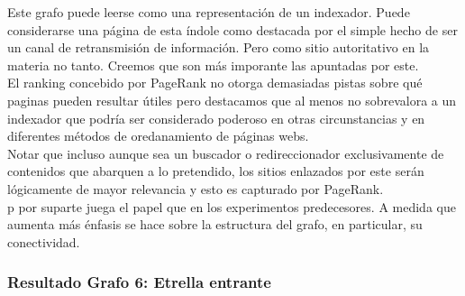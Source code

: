 Este grafo puede leerse como una representación de un indexador. Puede considerarse una página de esta índole como destacada por el simple hecho de ser un canal de retransmisión de información. Pero como sitio autoritativo en la materia no tanto. Creemos que son más imporante las apuntadas por este. \\

El ranking concebido por PageRank no otorga demasiadas pistas sobre qué paginas pueden resultar útiles pero destacamos que al menos no sobrevalora a un indexador que podría ser considerado poderoso en otras circunstancias y en diferentes métodos de oredanamiento de páginas webs. \\
Notar que incluso aunque sea un buscador o redireccionador exclusivamente de contenidos que abarquen a lo pretendido, los sitios enlazados por este serán lógicamente de mayor relevancia y esto es capturado por PageRank.\\

p por suparte juega el papel que en los experimentos predecesores. A medida que aumenta más énfasis se hace sobre la estructura del grafo, en particular, su conectividad. \\
            
\subsubsection{Resultado Grafo 6: Etrella entrante} 

